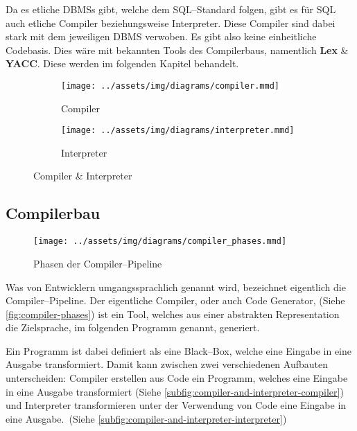 Da es etliche \acp{DBMS} gibt, welche dem \ac{SQL}--Standard folgen, gibt es für \ac{SQL} auch etliche Compiler beziehungsweise Interpreter.
Diese Compiler sind dabei stark mit dem jeweiligen \ac{DBMS} verwoben.
Es gibt also keine einheitliche Codebasis.
Dies wäre mit bekannten Tools des Compilerbaus, namentlich \textbf{Lex} \& \textbf{YACC}.
Diese werden im folgenden Kapitel behandelt.

\begin{figure}[ht]
    \begin{subfigure}[c]{0.5\textwidth}
        \begin{center}
            \texttt{[image: ../assets/img/diagrams/compiler.mmd]}
        \end{center}
        \caption{Compiler}
        \label{subfig:compiler-and-interpreter-compiler}
    \end{subfigure}
    \begin{subfigure}[c]{0.5\textwidth}
        \begin{center}
            \texttt{[image: ../assets/img/diagrams/interpreter.mmd]}
        \end{center}
        \caption{Interpreter}
        \label{subfig:compiler-and-interpreter-interpreter}
    \end{subfigure}
    \caption{Compiler \& Interpreter~\autocite{aho-2006}}
    \label{fig:compiler-and-interpreter}
\end{figure}
\newpage

\subsection{Compilerbau}\label{subsec:compilerbau}
\begin{wrapfigure}{rH}{0.47\textwidth}
    \begin{center}
        \texttt{[image: ../assets/img/diagrams/compiler\_phases.mmd]}
    \end{center}
    \caption{Phasen der Compiler--Pipeline~\autocite{aho-2006}}
    \label{fig:compiler-phases}
\end{wrapfigure}
Was von Entwicklern umgangssprachlich  genannt wird, bezeichnet eigentlich die Compiler--Pipeline.
Der eigentliche Compiler, oder auch Code Generator, (Siehe \autoref{fig:compiler-phases}) ist ein Tool, welches aus einer abstrakten Representation die Zielsprache, im folgenden Programm genannt, generiert.

Ein Programm ist dabei definiert als eine Black--Box, welche eine Eingabe in eine Ausgabe transformiert.
Damit kann zwischen zwei verschiedenen Aufbauten unterscheiden: Compiler erstellen aus Code ein Programm, welches eine Eingabe in eine Ausgabe transformiert (Siehe \autoref{subfig:compiler-and-interpreter-compiler}) und Interpreter transformieren unter der Verwendung von Code eine Eingabe in eine Ausgabe.~(Siehe \autoref{subfig:compiler-and-interpreter-interpreter})

